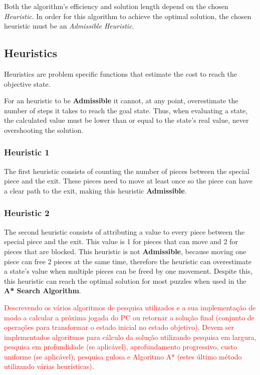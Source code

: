 \documentclass[conference]{IEEEtran}
\begin{document}
Both the algorithm's efficiency and solution length depend on the chosen \textit{Heuristic}. In order for this algorithm to achieve the optimal solution, the chosen heuristic must be an \textit{Admissible Heuristic}.


\subsection{Heuristics}

Heuristics are problem specific functions that estimate the cost to reach the objective state.

For an heuristic to be \textbf{Admissible} it cannot, at any point, overestimate the number of steps it takes to reach the goal state. Thus, when evaluating a state, the calculated value must be lower than or equal to the state's real value, never overshooting the solution.

\subsubsection{Heuristic 1}

The first heuristic consists of counting the number of pieces between the special piece and the exit. These pieces need to move at least once so the piece can have a clear path to the exit, making this heuristic \textbf{Admissible}.

\subsubsection{Heuristic 2}

The second heuristic consists of attributing a value to every piece between the special piece and the exit. This value is 1 for pieces that can move and 2 for pieces that are blocked. This heuristic is not \textbf{Admissible}, because moving one piece can free 2 pieces at the same time, therefore the heuristic can overestimate a state's value when multiple pieces can be freed by one movement. Despite this, this heuristic can reach the optimal solution for most puzzles when used in the \textbf{A* Search Algorithm}.

\textcolor{red}{Descrevendo os vários algoritmos de pesquisa utilizados e a sua implementação de modo a calcular a próxima jogada do PC ou retornar a solução final (conjunto de operações para transformar o estado inicial no estado objetivo). Devem ser implementados algoritmos para cálculo da solução utilizando pesquisa em largura, pesquisa em profundidade (se aplicável), aprofundamento progressivo, custo uniforme (se aplicável), pesquisa gulosa e Algoritmo A* (estes último método utilizando várias heurísticas).}
\end{document}
